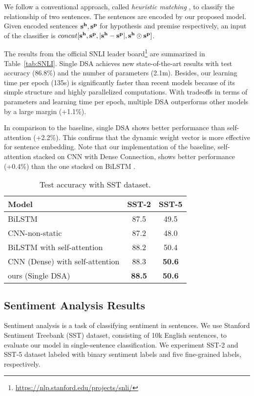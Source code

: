 \documentclass[11pt,a4paper]{article}
\begin{document}
We follow a conventional approach, called \textit{heuristic matching} \cite{heuristicmatching}, to classify the relationship of two sentences. The sentences are encoded by our proposed model. Given encoded sentences ${\bf s^h}, {\bf s^p}$ for hypothesis and premise respectively, an input of the classifier is $concat[{\bf s^h}, {\bf s^p}, |{\bf s^h} - {\bf s^p}|, {\bf s^h}\odot{}{\bf s^p}]$.



The results from the official SNLI leader  board\footnote{\url{https://nlp.stanford.edu/projects/snli/}} are summarized in Table~\ref{tab:SNLI}. Single DSA achieves new state-of-the-art results with test accuracy (86.8\%) and the number of parameters (2.1m). Besides, our learning time per epoch (135s) is significantly faster than recent models because of its simple structure and highly parallelized computations. With tradeoffs in terms of parameters and learning time per epoch, multiple DSA outperforms other models by a large margin (+1.1\%).

In comparison to the baseline, single DSA shows better performance than self-attention (+2.2\%). This confirms that the dynamic weight vector is more effective for sentence embedding. Note that our implementation of the baseline, self-attention stacked on CNN with Dense Connection, shows better performance (+0.4\%) than the one stacked on BiLSTM \cite{Yang}.

\setlength{\tabcolsep}{0.4em}
\begin{table}[t]
	\small
	\begin{center}
		\begin{tabular}{|l|c|c|}
		    \hline
			{\bf Model} & {\bf SST-2} & {\bf SST-5} \\ 
			\hline
			BiLSTM \cite{baseline_lstm_bilstm} & 87.5  & 49.5  \\
			CNN-non-static \cite{yoonkim} & 87.2 & 48.0\\
			BiLSTM with self-attention  & 88.2   & 50.4 \\
		    CNN (Dense) with self-attention  & 88.3  & \bf{50.6} \\
			\hline
		    ours (Single DSA) & \textbf{88.5} & \textbf{50.6} \\
		    \hline
		\end{tabular}
	\end{center}
	\caption{Test accuracy with SST dataset.}
	\label{tab:SST}
\end{table}


\subsection {Sentiment Analysis Results}
Sentiment analysis is a task of classifying sentiment in sentences. We use Stanford Sentiment Treebank (SST) dataset, consisting of 10k English sentences, to evaluate our model in single-sentence classification. We experiment SST-2 and SST-5 dataset labeled with binary sentiment labels and five fine-grained labels, respectively. 
\end{document}

